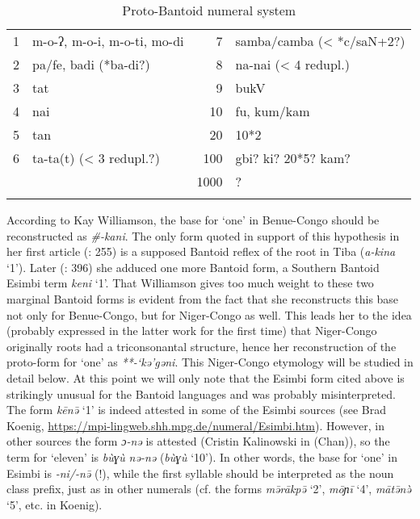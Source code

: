 \begin{table}
\caption[Proto-Bantoid numeral system]{\label{tab:3:14}Proto-Bantoid numeral system\footnotemark} 
\begin{tabularx}{\textwidth}{rX rl}
\lsptoprule
{1} & m-o-ʔ, m-o-i, m-o-ti, mo-di &  {7} & samba/camba (< *c/saN+2?)\\
{2} & pa/fe, badi (*ba-di?) &  {8} & na-nai (< 4 redupl.)\\
{3} & tat &  {9} & bukV\\
{4} & nai &  {10} & fu, kum/kam\\
{5} & tan &  {20} & 10*2\\
{6} & ta-ta(t) (< 3 redupl.?) &  {100} & gbi? ki? 20*5? kam?\\
&  &  {1000} & ?\\
\lspbottomrule
\end{tabularx}
\end{table}

According to Kay Williamson, the base for `one' in Benue-Congo should be reconstructed as \textit{\#-kani}. The only form quoted in support of this hypothesis in her first article (\citealt{Williamson1989b}: 255) is a supposed Bantoid reflex of the root in Tiba (\textit{a-kina} ‘1’). Later (\citealt{Williamson1992}: 396) she adduced one more Bantoid form, a Southern Bantoid Esimbi term \textit{keni} ‘1’. That Williamson gives too much weight to these two marginal Bantoid forms is evident from the fact that she reconstructs this base not only for Benue-Congo, but for Niger-Congo as well. This leads her to the idea (probably expressed in the latter work for the first time) that Niger-Congo originally roots had a triconsonantal structure, hence her reconstruction of the proto-form for ‘one’ as \textit{**-‘kə’gəni}. This Niger-Congo etymology will be studied in detail below. At this point we will only note that the Esimbi form cited above is strikingly unusual for the Bantoid languages and was probably misinterpreted. The form \textit{kēn{\={ə}}} ‘1’ is indeed attested in some of the Esimbi sources (see Brad Koenig, \url{https://mpi-lingweb.shh.mpg.de/numeral/Esimbi.htm}). However, in other sources the form \textit{ɔ-nə} is attested (Cristin Kalinowski in (Chan)), so the term for ‘eleven’ is \textit{bùɣù} \textit{nə-nə} (\textit{bùɣù} ‘10’). In other words, the base for ‘one’ in Esimbi is \textit{-ni/-n{\={ə}}} (!), while the first syllable should be interpreted as the noun class prefix, just as in other numerals (cf. the forms \textit{m{\={ə}}rākp{\={ə}}} ‘2’, \textit{mōɲī} ‘4’, \textit{māt{\={ə}}n{\`{ə}}} ‘5’, etc. in Koenig). 

